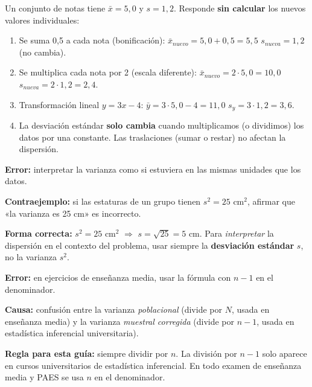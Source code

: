 \documentclass[11pt, letterpaper]{article}
\begin{document}
\begin{tcolorbox}[examplebox, title={Ej. 13. Propiedades de transformación}]
Un conjunto de notas tiene $\bar{x} = 5{,}0$ y $s = 1{,}2$. Responde \textbf{sin calcular} los nuevos valores individuales:

\begin{enumerate}[label=\textbf{\arabic*.}, leftmargin=2.8cm]
  \item[\textbf{Caso A.}] Se suma 0{,}5 a cada nota (bonificación): \quad $\bar{x}_{nuevo} = 5{,}0 + 0{,}5 = 5{,}5$ \quad $s_{nueva} = 1{,}2$ (no cambia).

  \medskip
  \item[\textbf{Caso B.}] Se multiplica cada nota por 2 (escala diferente): \quad $\bar{x}_{nuevo} = 2 \cdot 5{,}0 = 10{,}0$ \quad $s_{nueva} = 2 \cdot 1{,}2 = 2{,}4$.

  \medskip
  \item[\textbf{Caso C.}] Transformación lineal $y = 3x - 4$: \quad $\bar{y} = 3 \cdot 5{,}0 - 4 = 11{,}0$ \quad $s_y = 3 \cdot 1{,}2 = 3{,}6$.

  \medskip
  \item[\textbf{Conclusión.}] La desviación estándar \textbf{solo cambia} cuando multiplicamos (o dividimos) los datos por una constante. Las traslaciones (sumar o restar) no afectan la dispersión.
\end{enumerate}
\end{tcolorbox}

\begin{tcolorbox}[warningbox, title={Error frecuente: confundir varianza con desviación estándar}]
\textbf{Error:} interpretar la varianza como si estuviera en las mismas unidades que los datos.

\medskip
\textbf{Contraejemplo:} si las estaturas de un grupo tienen $s^2 = 25$ cm$^2$, afirmar que «la varianza es 25 cm» es incorrecto.

\medskip
\textbf{Forma correcta:} $s^2 = 25$ cm$^2$ $\Rightarrow$ $s = \sqrt{25} = 5$ cm. Para \textit{interpretar} la dispersión en el contexto del problema, usar siempre la \textbf{desviación estándar} $s$, no la varianza $s^2$.
\end{tcolorbox}

\begin{tcolorbox}[warningbox, title={Error frecuente: dividir por $n-1$ en lugar de $n$}]
\textbf{Error:} en ejercicios de enseñanza media, usar la fórmula con $n-1$ en el denominador.

\medskip
\textbf{Causa:} confusión entre la varianza \textit{poblacional} (divide por $N$, usada en enseñanza media) y la varianza \textit{muestral corregida} (divide por $n-1$, usada en estadística inferencial universitaria).

\medskip
\textbf{Regla para esta guía:} siempre dividir por $n$. La división por $n-1$ solo aparece en cursos universitarios de estadística inferencial. En todo examen de enseñanza media y PAES se usa $n$ en el denominador.
\end{tcolorbox}
\end{document}
